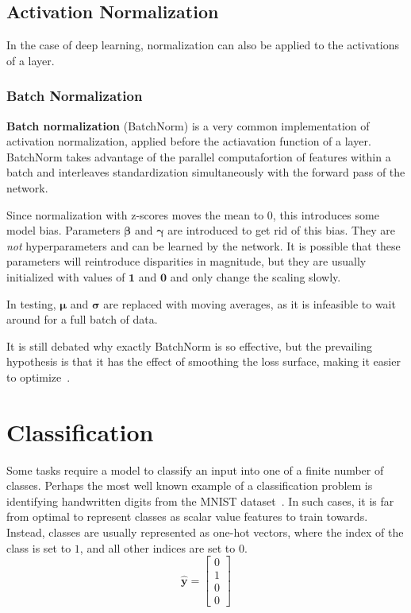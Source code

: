 \documentclass[12pt]{report}
\theoremstyle{definition}
\theoremstyle{remark}
\begin{document}
\subsection{Activation Normalization}
In the case of deep learning, normalization can also be applied to the activations of a layer.

\subsubsection{Batch Normalization}
\textbf{Batch normalization} (BatchNorm) is a very common implementation of activation normalization, applied before the actiavation function of a layer. BatchNorm takes advantage of the parallel computafortion of features within a batch and interleaves standardization simultaneously with the forward pass of the network.

Since normalization with z-scores moves the mean to $0$, this introduces some model bias. Parameters $\boldsymbol{\beta}$ and $\boldsymbol{\gamma}$ are introduced to get rid of this bias. They are \textit{not} hyperparameters and can be learned by the network. It is possible that these parameters will reintroduce disparities in magnitude, but they are usually initialized with values of $\mathbf{1}$ and $\mathbf{0}$ and only change the scaling slowly.

In testing, $\boldsymbol{\mu}$ and $\boldsymbol{\sigma}$ are replaced with moving averages, as it is infeasible to wait around for a full batch of data.

It is still debated why exactly BatchNorm is so effective, but the prevailing hypothesis is that it has the effect of smoothing the loss surface, making it easier to optimize~\cite{ioffe_batch_2015, ioffe_batch_2017, santurkar_how_2019}.

\section{Classification}\label{sec:classification}
Some tasks require a model to classify an input into one of a finite number of classes. Perhaps the most well known example of a classification problem is identifying handwritten digits from the MNIST dataset~\cite{lecun_gradient-based_1998}. In such cases, it is far from optimal to represent classes as scalar value features to train towards. Instead, classes are usually represented as one-hot vectors, where the index of the class is set to $1$, and all other indices are set to $0$.
\begin{equation}
    \mathbf{\hat{y}} = \begin{bmatrix}
        0 \\
        1 \\
        0 \\
        0
    \end{bmatrix}
\end{equation}
\end{document}
